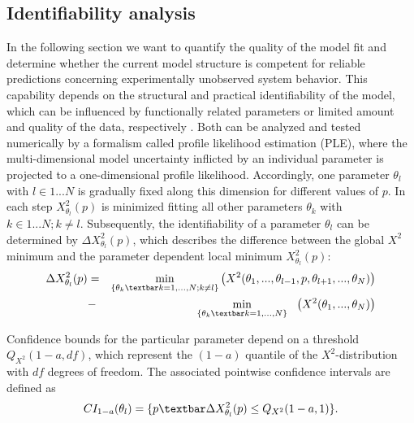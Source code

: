 \subsection{Identifiability analysis}
In the following section we want to quantify the quality of the model fit and determine whether the current model structure is competent for reliable predictions concerning experimentally unobserved system behavior. This capability depends on the structural and practical identifiability of the model, which can be influenced by functionally related parameters or limited amount and quality of the data, respectively \cite{Cobelli1980,Swameye2003}. Both can be analyzed and tested numerically by a formalism called profile likelihood estimation (PLE)\cite{Venzon1988,Murphy2000,Raue2009}, where the multi-dimensional model uncertainty inflicted by an individual parameter is projected to a one-dimensional profile likelihood. Accordingly, one parameter $\theta_l$ with $l\in{1...N}$ is gradually fixed along this dimension for different values of $p$. In each step $X_{\theta_l}^2(p)$ is minimized fitting all other parameters $\theta_k$ with $k\in{1...N};k\neq l$. Subsequently, the identifiability of a parameter $\theta_l$ can be determined by $\Delta X_{\theta_l}^2(p)$, which describes the difference between the global $X^2$ minimum and the parameter dependent local minimum $X_{\theta_l}^2(p)$:
\begin{eqnarray}
	\Delta X_{\theta_l}^2(p) &=& \min_{\{\theta_k\textbar k=1,...,N;k\neq l\}} \left( X^2 (\theta_1,...,\theta_{l-1},p,\theta_{l+1},...,\theta_N )\right)\nonumber \\
	&-& \quad \! \min_{\{\theta_k\textbar k=1,...,N\}} \quad \!\! \left( X^2 (\theta_1,...,\theta_N )\right)
\end{eqnarray}  

Confidence bounds for the particular parameter depend on a threshold $Q_{X^2}(1-a,df)$, which represent the $(1-a)$ quantile of the $X^2$-distribution with $df$ degrees of freedom. The associated pointwise confidence intervals are defined as
\begin{equation}
CI_{1-a}(\theta_l)= \{p\textbar \Delta X_{\theta_l}^2(p)\leq Q_{X^2}(1-a,1)\}.
\label{eqn:confidenceIntervals}
\end{equation} 

